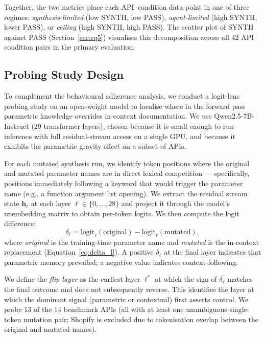 Together, the two metrics place each API--condition data point in one of three regimes: \emph{synthesis-limited} (low SYNTH, low PASS), \emph{agent-limited} (high SYNTH, lower PASS), or \emph{ceiling} (high SYNTH, high PASS). The scatter plot of SYNTH against PASS (Section~\ref{sec:rq5}) visualises this decomposition across all 42 API--condition pairs in the primary evaluation.

\subsection{Probing Study Design}
\label{sec:probing_design}

To complement the behavioural adherence analysis, we conduct a logit-lens probing study on an open-weight model to localise where in the forward pass parametric knowledge overrides in-context documentation. We use Qwen2.5-7B-Instruct (29 transformer layers), chosen because it is small enough to run inference with full residual-stream access on a single GPU, and because it exhibits the parametric gravity effect on a subset of APIs.

For each mutated synthesis run, we identify token positions where the original and mutated parameter names are in direct lexical competition --- specifically, positions immediately following a keyword that would trigger the parameter name (e.g., a function argument list opening). We extract the residual stream state $\mathbf{h}_\ell$ at each layer $\ell \in \{0, \ldots, 28\}$ and project it through the model's unembedding matrix to obtain per-token logits. We then compute the logit difference:
\begin{equation}
  \delta_\ell = \text{logit}_\ell(\text{original}) - \text{logit}_\ell(\text{mutated}),
  \label{eq:delta_l}
\end{equation}
where \emph{original} is the training-time parameter name and \emph{mutated} is the in-context replacement (Equation~\ref{eq:delta_l}). A positive $\delta_\ell$ at the final layer indicates that parametric memory prevailed; a negative value indicates context-following.

We define the \emph{flip layer} as the earliest layer $\ell^*$ at which the sign of $\delta_\ell$ matches the final outcome and does not subsequently reverse. This identifies the layer at which the dominant signal (parametric or contextual) first asserts control. We probe 13 of the 14 benchmark APIs (all with at least one unambiguous single-token mutation pair; Shopify is excluded due to tokenisation overlap between the original and mutated names). 
